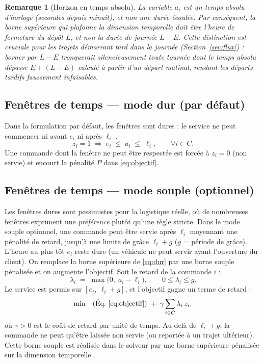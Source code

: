 \documentclass[12pt,a4paper]{report}
\newtheorem{remarque}{Remarque}
\begin{document}
\begin{remarque}[Horizon en temps absolu]
La variable $a_i$ est un temps \emph{absolu} d'horloge (secondes depuis
minuit), et non une durée écoulée. Par conséquent, la borne supérieure qui
plafonne la dimension temporelle doit être l'heure de \emph{fermeture} du
dépôt $L$, et non la durée de journée $L-E$. Cette distinction est cruciale
pour les trajets démarrant tard dans la journée (Section~\ref{sec:flux}) :
borner par $L-E$ tronquerait silencieusement toute tournée dont le temps
absolu dépasse $E + (L-E)$ calculé à partir d'un départ matinal, rendant les
départs tardifs faussement infaisables.
\end{remarque}

\subsection{Fenêtres de temps --- mode dur (par défaut)}

Dans la formulation par défaut, les fenêtres sont dures : le service ne peut
commencer ni avant $e_i$ ni après $\ell_i$ \cite{solomon1987}.
%
\begin{equation}
  z_i = 1 \;\Longrightarrow\; e_i \;\leq\; a_i \;\leq\; \ell_i,
  \qquad \forall i \in C.
  \label{eq:dur}
\end{equation}
%
Une commande dont la fenêtre ne peut être respectée est forcée à $z_i = 0$
(non servie) et encourt la pénalité $P$ dans \eqref{eq:objectif}.

\subsection{Fenêtres de temps --- mode souple (optionnel)}
\label{sec:souple}

Les fenêtres dures sont pessimistes pour la logistique réelle, où de
nombreuses fenêtres expriment une \emph{préférence} plutôt qu'une règle
stricte. Dans le mode souple optionnel, une commande peut être servie après
$\ell_i$ moyennant une pénalité de retard, jusqu'à une limite de grâce
$\ell_i + g$ ($g$ = période de grâce). L'heure au plus tôt $e_i$ reste dure
(un véhicule ne peut servir avant l'ouverture du client). On remplace la
borne supérieure de \eqref{eq:dur} par une borne souple pénalisée et on
augmente l'objectif. Soit le retard de la commande $i$ :
%
\begin{equation}
  \lambda_i \;=\; \max\bigl(0,\; a_i - \ell_i\bigr),
  \qquad 0 \leq \lambda_i \leq g .
  \label{eq:retard}
\end{equation}
%
Le service est permis sur $[e_i,\ \ell_i + g]$, et l'objectif gagne un terme
de retard :
%
\begin{equation}
  \min \quad (\text{Éq.}~\ref{eq:objectif})
    \;+\; \gamma \sum_{i \in C} \lambda_i \, z_i,
  \label{eq:objsouple}
\end{equation}
%
où $\gamma > 0$ est le coût de retard par unité de temps. Au-delà de
$\ell_i + g$, la commande ne peut qu'être laissée non servie (ou reportée à
un trajet ultérieur). Cette borne souple est réalisée dans le solveur par
une borne supérieure pénalisée sur la dimension temporelle \cite{ortools}.
\end{document}
